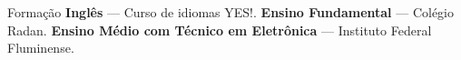 \begin{rubric}{Formação}
\entry*[2018 -- 2023]%
	\textbf{Inglês} — Curso de idiomas YES!.
%
\entry*[2010 -- 2018]%
	\textbf{Ensino Fundamental} — Colégio Radan.
% 
\entry*[2019 -- 2022]%
	\textbf{Ensino Médio com Técnico em Eletrônica} — Instituto Federal Fluminense.
\end{rubric}